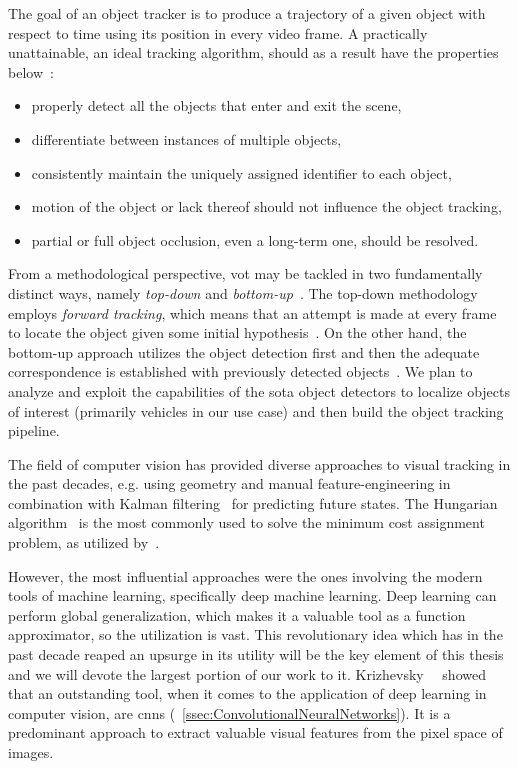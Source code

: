 The goal of an object tracker is to produce a trajectory of a given object with respect to time using its position in every video frame. A practically unattainable, an ideal tracking algorithm, should as a result have the properties below~\cite{jalal2012sotavot}:
\begin{itemize}
    \item properly detect all the objects that enter and exit the scene,
    \item differentiate between instances of multiple objects,
    \item consistently maintain the uniquely assigned identifier to each object,
    \item motion of the object or lack thereof should not influence the object tracking,
    \item partial or full object occlusion, even a long-term one, should be resolved.
\end{itemize}

From a methodological perspective, \gls{vot} may be tackled in two fundamentally distinct ways, namely \emph{top-down} and \emph{bottom-up}~\cite{jalal2012sotavot}. The top-down methodology employs \emph{forward tracking}, which means that an attempt is made at every frame to locate the object given some initial hypothesis~\cite{comaniciu2003kernel}. On the other hand, the bottom-up approach utilizes the object detection first and then the adequate correspondence is established with previously detected objects~\cite{wren1997pfinder}. We plan to analyze and exploit the capabilities of the \gls{sota} object detectors to localize objects of interest (primarily vehicles in our use case) and then build the object tracking pipeline.

The field of computer vision has provided diverse approaches to visual tracking in the past decades, e.g. using geometry and manual feature-engineering in combination with Kalman filtering~\cite{kalman1960linearfilter} for predicting future states. The Hungarian algorithm~\cite{kuhn1995hungarian} is the most commonly used to solve the minimum cost assignment problem, as utilized by~\cite{bawley2016simple}.

However, the most influential approaches were the ones involving the modern tools of machine learning, specifically deep machine learning. Deep learning can perform global generalization, which makes it a valuable tool as a function approximator, so the utilization is vast. This revolutionary idea which has in the past decade reaped an upsurge in its utility will be the key element of this thesis and we will devote the largest portion of our work to it. Krizhevsky~\etal{}~\cite{krizhevsky2012classification} showed that an outstanding tool, when it comes to the application of deep learning in computer vision, are \glspl{cnn} (\sectionstr{}~\ref{ssec:ConvolutionalNeuralNetworks}). It is a predominant approach to extract valuable visual features from the pixel space of images.

